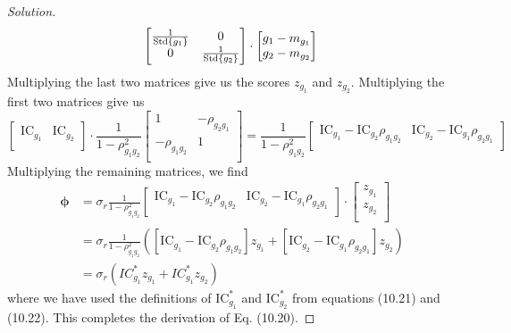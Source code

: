 \begin{proof}[Solution]
\begin{equation*}
\begin{bmatrix}
		 \frac{1}{\mathrm{Std}\{g_{1}\}}	&	0 			\\
		 0				&	\frac{1}{\mathrm{Std}\{g_{2}\}}   \\
		\end{bmatrix}
		\cdot
		\begin{bmatrix}
                    g_{1} - m_{g_{1}} \\
                    g_{2} - m_{g_{2}} \\
                \end{bmatrix}\\
  \end{equation*}
  Multiplying the last two matrices give us the scores $z_{g_{1}}$ and $z_{g_{2}}$. Multiplying the first two matrices give us
  \begin{equation*}
      \begin{bmatrix}
		  \mathrm{IC}_{g_{1}} & \mathrm{IC}_{g_{2}} \\
		\end{bmatrix}
		\cdot
		\frac{1}{1-\rho_{g_{1}g_{2}}^{2}}
		\begin{bmatrix}
		    1	   &	-\rho_{g_{2}g_{1}}   \\
		   -\rho_{g_{1}g_{2}}	&	 1   \\
		\end{bmatrix}
		=\frac{1}{1-\rho_{g_{1}g_{2}}^{2}}
		\begin{bmatrix}
		 \mathrm{IC}_{g_{1}} - \mathrm{IC}_{g_{2}}\rho_{g_{1}g_{2}}	&
		 \mathrm{IC}_{g_{2}} - \mathrm{IC}_{g_{1}}\rho_{g_{2}g_{1}}\\
		\end{bmatrix}
  \end{equation*}
  Multiplying the remaining matrices, we find
  \begin{align*}
  \bm{\phi}&=\sigma_{r}
   \frac{1}{1-\rho_{g_{1}g_{2}}^{2}}
   \begin{bmatrix}
		 \mathrm{IC}_{g_{1}} - \mathrm{IC}_{g_{2}}\rho_{g_{1}g_{2}}	&
		 \mathrm{IC}_{g_{2}} - \mathrm{IC}_{g_{1}}\rho_{g_{2}g_{1}}\\
   \end{bmatrix}
   \cdot
   \begin{bmatrix}
    z_{g_{1}} \\ z_{g_{2}}\\
   \end{bmatrix}\\
   &=\sigma_{r}
   \frac{1}{1-\rho_{g_{1}g_{2}}^{2}}\left(\left[\mathrm{IC}_{g_{1}} - \mathrm{IC}_{g_{2}}\rho_{g_{1}g_{2}}\right]z_{g_{1}}+\left[\mathrm{IC}_{g_{2}} - \mathrm{IC}_{g_{1}}\rho_{g_{2}g_{1}}\right]z_{g_{2}}\right)\\
   &=\sigma_{r}\left(IC_{g_{1}}^{*}z_{g_{1}}+IC_{g_{1}}^{*}z_{g_{2}}\right)
  \end{align*}
  where we have used the definitions of $\mathrm{IC}_{g_{1}}^{*}$ and $\mathrm{IC}_{g_{2}}^{*}$ from equations (10.21) and (10.22). This completes the derivation of Eq. (10.20).
\end{proof}


